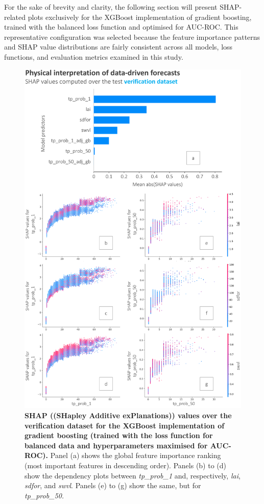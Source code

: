 \documentclass[nhess, manuscript]{copernicus}
\begin{document}
For the sake of brevity and clarity, the following section will present SHAP-related plots exclusively for the XGBoost implementation of gradient boosting, trained with the balanced loss function and optimised for AUC-ROC. This representative configuration was selected because the feature importance patterns and SHAP value distributions are fairly consistent across all models, loss functions, and evaluation metrics examined in this study. 

\begin{figure}[t]
\includegraphics[width=12cm]{figures/shap.png}
\caption{\textbf{SHAP ((SHapley Additive exPlanations)) values over the \textcolor{colourTest}{verification dataset} for the  XGBoost implementation of gradient boosting (trained with the loss function for balanced data and hyperparameters maximised for AUC-ROC).} Panel (a) shows the global feature importance ranking (most important features in descending order). Panels (b) to (d) show the dependency plots between \textit{tp\_prob\_1} and, respectively, \textit{lai}, \textit{sdfor}, and \textit{swvl}. Panels (e) to (g) show the same, but for \textit{tp\_prob\_50.}}
\label{fig:shap}
\end{figure}
\end{document}
